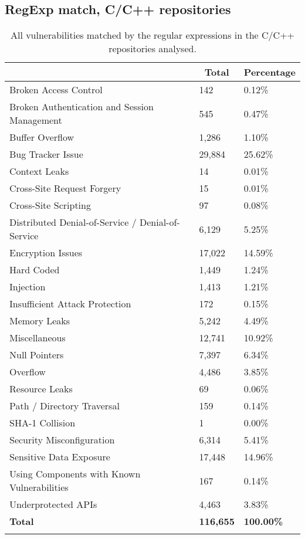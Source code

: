 \documentclass[acb16zje.tex]{subfiles}
\begin{document}
\subsection{RegExp match, C/C++ repositories}
\begin{longtable}{|l|l|l|}
  \hline \endfirsthead \rowcolor[HTML]{D8D8D8}
  \multicolumn{1}{|c|}{Vulnerabilities} & \multicolumn{1}{|c|}{Total} &
  \multicolumn{1}{|c|}{Percentage} \\ \hline
  Broken Access Control & 142 & 0.12\% \\
  Broken Authentication and Session Management & 545 & 0.47\% \\
  Buffer Overflow & 1,286 & 1.10\% \\
  Bug Tracker Issue & 29,884 & 25.62\% \\
  Context Leaks & 14 & 0.01\% \\
  Cross-Site Request Forgery & 15 & 0.01\% \\
  Cross-Site Scripting & 97 & 0.08\% \\
  Distributed Denial-of-Service / Denial-of-Service & 6,129 & 5.25\% \\
  Encryption Issues & 17,022 & 14.59\% \\
  Hard Coded & 1,449 & 1.24\% \\
  Injection & 1,413 & 1.21\% \\
  Insufficient Attack Protection & 172 & 0.15\% \\
  Memory Leaks & 5,242 & 4.49\% \\
  Miscellaneous & 12,741 & 10.92\% \\
  Null Pointers & 7,397 & 6.34\% \\
  Overflow & 4,486 & 3.85\% \\
  Resource Leaks & 69 & 0.06\% \\
  Path / Directory Traversal & 159 & 0.14\% \\
  SHA-1 Collision & 1 & 0.00\% \\
  Security Misconfiguration & 6,314 & 5.41\% \\
  Sensitive Data Exposure & 17,448 & 14.96\% \\
  Using Components with Known Vulnerabilities & 167 & 0.14\% \\
  Underprotected APIs & 4,463 & 3.83\% \\ \hline
  \textbf{Total} & \textbf{116,655} & \textbf{100.00\%} \\ \hline
  \caption{All vulnerabilities matched by the regular expressions in the C/C++ repositories
  analysed.}
\end{longtable}
\end{document}
